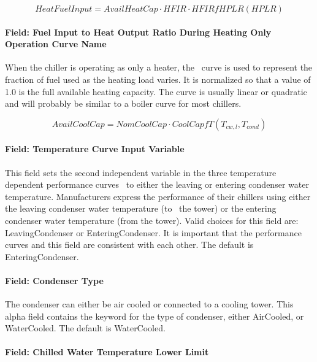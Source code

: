 \begin{equation}
HeatFuelInput = AvailHeatCap \cdot HFIR \cdot HFIRfHPLR(HPLR)
\end{equation}

\paragraph{Field: Fuel Input to Heat Output Ratio During Heating Only Operation Curve Name}\label{field-fuel-input-to-heat-output-ratio-during-heating-only-operation-curve-name}

When the chiller is operating as only a heater, the~ curve is used to represent the fraction of fuel used as the heating load varies. It is normalized so that a value of 1.0 is the full available heating capacity. The curve is usually linear or quadratic and will probably be similar to a boiler curve for most chillers.

\begin{equation}
AvailCoolCap = NomCoolCap \cdot CoolCapfT({T_{cw,l}},{T_{cond}})
\end{equation}

\paragraph{Field: Temperature Curve Input Variable}\label{field-temperature-curve-input-variable}

This field sets the second independent variable in the three temperature dependent performance curves~ to either the leaving or entering condenser water temperature. Manufacturers express the performance of their chillers using either the leaving condenser water temperature (to~ the tower) or the entering condenser water temperature (from the tower). Valid choices for this field are: LeavingCondenser or EnteringCondenser. It is important that the performance curves and this field are consistent with each other. The default is EnteringCondenser.

\paragraph{Field: Condenser Type}\label{field-condenser-type-5-000}

The condenser can either be air cooled or connected to a cooling tower. This alpha field contains the keyword for the type of condenser, either AirCooled, or WaterCooled. The default is WaterCooled.

\paragraph{Field: Chilled Water Temperature Lower Limit}\label{field-chilled-water-temperature-lower-limit}

